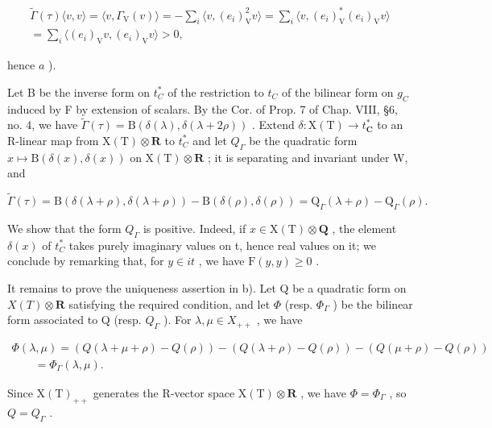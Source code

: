 \[
\begin{array}{c} \tilde {\Gamma} (\tau) \langle v, v \rangle = \langle v, \Gamma_ {\mathrm{V}} (v) \rangle = - \sum_ {i} \langle v, (e _ {i}) _ {\mathrm{V}} ^ {2} v \rangle = \sum_ {i} \langle v, (e _ {i}) _ {\mathrm{V}} ^ {*} (e _ {i}) _ {\mathrm{V}} v \rangle \\ = \sum_ {i} \langle (e _ {i}) _ {\mathrm{V}} v, (e _ {i}) _ {\mathrm{V}} v \rangle > 0, \end{array}
\]

hence \(a\) ).

Let B be the inverse form on \(t_{C}^{*}\) of the restriction to \(t_{C}\) of the bilinear form on \(g_{C}\) induced by F by extension of scalars. By the Cor. of Prop. 7 of Chap. VIII, §6, no. 4, we have \(\tilde{\Gamma}(\tau) = \mathrm{B}(\delta(\lambda), \delta(\lambda + 2\rho))\) . Extend \(\delta : \mathrm{X(T)} \to t_{\mathbf{C}}^{*}\) to an R-linear map from \(\mathrm{X(T)} \otimes \mathbf{R}\) to \(t_{C}^{*}\) and let \(Q_{\Gamma}\) be the quadratic form \(x \mapsto \mathrm{B}(\delta(x), \delta(x))\) on \(\mathrm{X(T)} \otimes \mathbf{R}\) ; it is separating and invariant under W, and

\[
\tilde {\Gamma} (\tau) = \mathrm{B} (\delta (\lambda + \rho), \delta (\lambda + \rho)) - \mathrm{B} (\delta (\rho), \delta (\rho)) = \mathrm{Q} _ {\Gamma} (\lambda + \rho) - \mathrm{Q} _ {\Gamma} (\rho).
\]

We show that the form \(Q_{\Gamma}\) is positive. Indeed, if \(x \in \mathrm{X}(\mathrm{T}) \otimes \mathbf{Q}\) , the element \(\delta(x)\) of \(t_{C}^{*}\) takes purely imaginary values on t, hence real values on it; we conclude by remarking that, for \(y \in it\) , we have \(\mathrm{F}(y, y) \geq 0\) .

It remains to prove the uniqueness assertion in b). Let Q be a quadratic form on \(X(T) \otimes \mathbf{R}\) satisfying the required condition, and let \(\Phi\) (resp. \(\Phi_{\Gamma}\) ) be the bilinear form associated to Q (resp. \(Q_{\Gamma}\) ). For \(\lambda, \mu \in X_{++}\) , we have

\[
\begin{array}{l} \Phi (\lambda , \mu) = (Q (\lambda + \mu + \rho) - Q (\rho)) - (Q (\lambda + \rho) - Q (\rho)) - (Q (\mu + \rho) - Q (\rho)) \\ \qquad = \Phi_ {\Gamma} (\lambda , \mu). \end{array}
\]

Since \(\mathrm{X(T)_{++}}\) generates the R-vector space \(\mathrm{X(T)}\otimes\mathbf{R}\) , we have \(\Phi=\Phi_{\Gamma}\) , so \(Q=Q_{\Gamma}\) .

